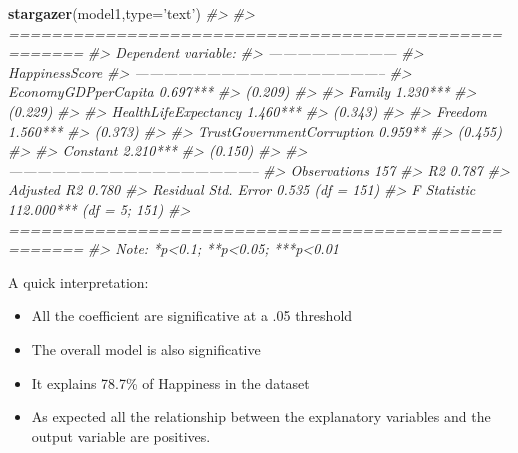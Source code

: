 \documentclass[]{book}
\newenvironment{Shaded}{\begin{snugshade}}{\end{snugshade}}
\newcommand{\CommentTok}[1]{\textcolor[rgb]{0.56,0.35,0.01}{\textit{#1}}}
\newcommand{\DataTypeTok}[1]{\textcolor[rgb]{0.13,0.29,0.53}{#1}}
\newcommand{\KeywordTok}[1]{\textcolor[rgb]{0.13,0.29,0.53}{\textbf{#1}}}
\newcommand{\NormalTok}[1]{#1}
\newcommand{\StringTok}[1]{\textcolor[rgb]{0.31,0.60,0.02}{#1}}
\providecommand{\tightlist}{%
  \setlength{\itemsep}{0pt}\setlength{\parskip}{0pt}}
\begin{document}
\begin{Shaded}
\begin{Highlighting}[]
\KeywordTok{stargazer}\NormalTok{(model1,}\DataTypeTok{type=}\StringTok{'text'}\NormalTok{)}
\CommentTok{#> }
\CommentTok{#> =====================================================}
\CommentTok{#>                               Dependent variable:    }
\CommentTok{#>                           ---------------------------}
\CommentTok{#>                                 HappinessScore       }
\CommentTok{#> -----------------------------------------------------}
\CommentTok{#> EconomyGDPperCapita                0.697***          }
\CommentTok{#>                                     (0.209)          }
\CommentTok{#>                                                      }
\CommentTok{#> Family                             1.230***          }
\CommentTok{#>                                     (0.229)          }
\CommentTok{#>                                                      }
\CommentTok{#> HealthLifeExpectancy               1.460***          }
\CommentTok{#>                                     (0.343)          }
\CommentTok{#>                                                      }
\CommentTok{#> Freedom                            1.560***          }
\CommentTok{#>                                     (0.373)          }
\CommentTok{#>                                                      }
\CommentTok{#> TrustGovernmentCorruption           0.959**          }
\CommentTok{#>                                     (0.455)          }
\CommentTok{#>                                                      }
\CommentTok{#> Constant                           2.210***          }
\CommentTok{#>                                     (0.150)          }
\CommentTok{#>                                                      }
\CommentTok{#> -----------------------------------------------------}
\CommentTok{#> Observations                          157            }
\CommentTok{#> R2                                   0.787           }
\CommentTok{#> Adjusted R2                          0.780           }
\CommentTok{#> Residual Std. Error            0.535 (df = 151)      }
\CommentTok{#> F Statistic                112.000*** (df = 5; 151)  }
\CommentTok{#> =====================================================}
\CommentTok{#> Note:                     *p<0.1; **p<0.05; ***p<0.01}
\end{Highlighting}
\end{Shaded}

A quick interpretation:

\begin{itemize}
\tightlist
\item
  All the coefficient are significative at a .05 threshold
\item
  The overall model is also significative
\item
  It explains 78.7\% of Happiness in the dataset
\item
  As expected all the relationship between the explanatory variables and the output variable are positives.
\end{itemize}
\end{document}
